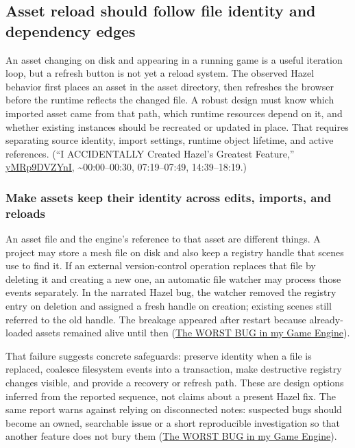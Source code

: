 \subsection{Asset reload should follow file identity and dependency edges}\label{06-engine-ii-ch041-asset-reload-should-follow-file-identity-and-dependency-edges}

\hypertarget{06-engine-ii-ch041-asset-reload-should-follow-file-identity-and-dependency-edges}{}

An asset changing on disk and appearing in a running game is a useful iteration loop, but a refresh button is not yet a reload system. The observed Hazel behavior first places an asset in the asset directory, then refreshes the browser before the runtime reflects the changed file. A robust design must know which imported asset came from that path, which runtime resources depend on it, and whether existing instances should be recreated or updated in place. That requires separating source identity, import settings, runtime object lifetime, and active references. (``I ACCIDENTALLY Created Hazel's Greatest Feature,'' \href{https://www.youtube.com/watch?v=yMRp9DVZYnI}{yMRp9DVZYnI}, \textasciitilde00:00--00:30, 07:19--07:49, 14:39--18:19.)

\subsubsection{Make assets keep their identity across edits, imports, and reloads}\label{06-engine-ii-ch041-make-assets-keep-their-identity-across-edits-imports-and-reloads}

\hypertarget{06-engine-ii-ch041-make-assets-keep-their-identity-across-edits-imports-and-reloads}{}

An asset file and the engine's reference to that asset are different things. A project may store a mesh file on disk and also keep a registry handle that scenes use to find it. If an external version-control operation replaces that file by deleting it and creating a new one, an automatic file watcher may process those events separately. In the narrated Hazel bug, the watcher removed the registry entry on deletion and assigned a fresh handle on creation; existing scenes still referred to the old handle. The breakage appeared after restart because already-loaded assets remained alive until then (\href{https://www.youtube.com/watch?v=x5dy8T9dRPk&t=0m3s}{The WORST BUG in my Game Engine}).

That failure suggests concrete safeguards: preserve identity when a file is replaced, coalesce filesystem events into a transaction, make destructive registry changes visible, and provide a recovery or refresh path. These are design options inferred from the reported sequence, not claims about a present Hazel fix. The same report warns against relying on disconnected notes: suspected bugs should become an owned, searchable issue or a short reproducible investigation so that another feature does not bury them (\href{https://www.youtube.com/watch?v=x5dy8T9dRPk&t=4m55s}{The WORST BUG in my Game Engine}).

